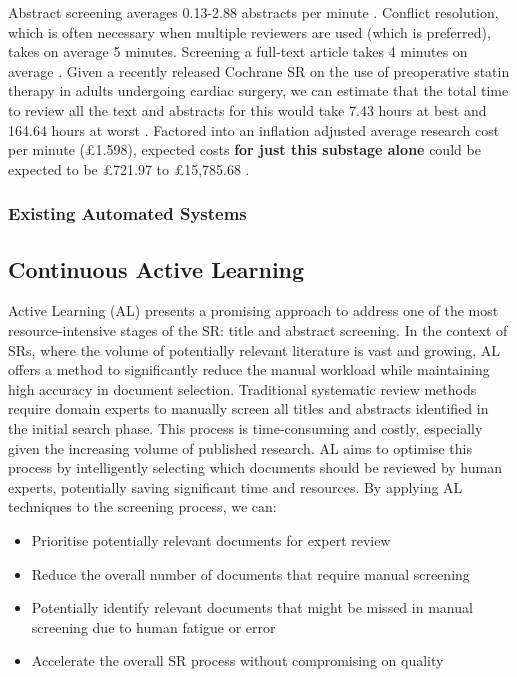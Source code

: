 \documentclass[10pt, english]{article}
\begin{document}
Abstract screening averages 0.13-2.88 abstracts per minute \cite{shemilt_use_2016, giummarra_evaluation_2020, felizardo_visual_2013}. Conflict resolution, which is often necessary when multiple reviewers are used (which is preferred), takes on average 5 minutes. Screening a full-text article takes 4 minutes on average \cite{shemilt_use_2016}. Given a recently released Cochrane SR on the use of preoperative statin therapy in adults undergoing cardiac surgery, we can estimate that the total time to review all the text and abstracts for this would take 7.43 hours at best and 164.64 hours at worst \cite{antunes_preoperative_nodate}. Factored into an inflation adjusted average research cost per minute (£1.598), expected costs \textbf{for just this substage alone} could be expected to be £721.97 to £15,785.68 \cite{nussbaumer-streit_resource_2021}.

\subsubsection{Existing Automated Systems}

\subsection{Continuous Active Learning}
Active Learning (AL) presents a promising approach to address one of the most resource-intensive stages of the SR: title and abstract screening. In the context of SRs, where the volume of potentially relevant literature is vast and growing, AL offers a method to significantly reduce the manual workload while maintaining high accuracy in document selection.
Traditional systematic review methods require domain experts to manually screen all titles and abstracts identified in the initial search phase. This process is time-consuming and costly, especially given the increasing volume of published research. AL aims to optimise this process by intelligently selecting which documents should be reviewed by human experts, potentially saving significant time and resources.
By applying AL techniques to the screening process, we can:
\begin{itemize}
    \item Prioritise potentially relevant documents for expert review
    \item Reduce the overall number of documents that require manual screening
    \item Potentially identify relevant documents that might be missed in manual screening due to human fatigue or error
    \item Accelerate the overall SR process without compromising on quality
\end{itemize}
\end{document}
